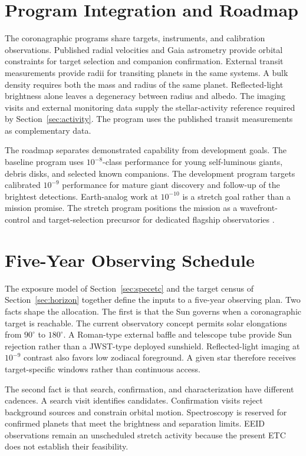 \section{Program Integration and Roadmap}
\label{sec:roadmap}

The coronagraphic programs share targets, instruments, and calibration
observations. Published radial velocities and Gaia astrometry provide
orbital constraints for target selection and companion confirmation.
External transit measurements provide radii for transiting planets in
the same systems. A bulk density requires both the mass and radius of
the same planet. Reflected-light brightness alone leaves a degeneracy
between radius and albedo. The imaging visits and external monitoring
data supply the stellar-activity reference required by
Section~\ref{sec:activity}. The program uses the published transit
measurements as complementary data.

The roadmap separates demonstrated capability from development goals.
The baseline program uses $10^{-8}$-class performance for young
self-luminous giants, debris disks, and selected known companions. The
development program targets calibrated $10^{-9}$ performance for mature
giant discovery and follow-up of the brightest detections. Earth-analog
work at $10^{-10}$ is a stretch goal rather than a mission promise. The
stretch program positions the mission as a wavefront-control and
target-selection precursor for dedicated flagship observatories
\cite{quanz22,hwo26}.

\section{Five-Year Observing Schedule}
\label{sec:schedule}

The exposure model of Section~\ref{sec:specetc} and the target census of
Section~\ref{sec:horizon} together define the inputs to a five-year observing
plan. Two facts shape the allocation. The first is that the Sun governs when a
coronagraphic target is reachable. The current observatory concept permits
solar elongations from $90^\circ$ to $180^\circ$. A Roman-type external baffle
and telescope tube provide Sun rejection rather than a JWST-type deployed
sunshield. Reflected-light imaging at $10^{-9}$ contrast also favors low
zodiacal foreground. A given star therefore receives target-specific windows
rather than continuous access.

The second fact is that search, confirmation, and characterization have
different cadences. A search visit identifies candidates. Confirmation
visits reject background sources and constrain orbital motion. Spectroscopy
is reserved for confirmed planets that meet the brightness and separation
limits. EEID observations remain an unscheduled stretch activity because
the present ETC does not establish their feasibility.


